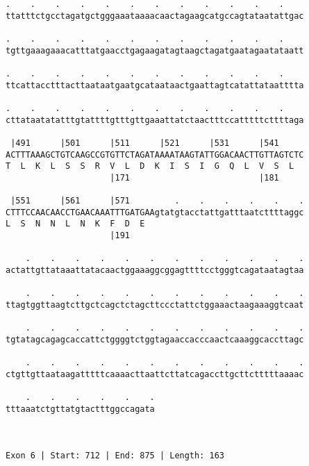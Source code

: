 \documentclass{article}
\begin{document}
\begin{Verbatim}
.    .    .    .    .    .    .    .    .    .    .    .    
ttatttctgcctagatgctgggaaataaaacaactagaagcatgccagtataatattgac
                                                            
.    .    .    .    .    .    .    .    .    .    .    .    
tgttgaaagaaacatttatgaacctgagaagatagtaagctagatgaatagaatataatt
                                                            
.    .    .    .    .    .    .    .    .    .    .    .    
ttcattacctttacttaataatgaatgcataataactgaattagtcatattataatttta
                                                            
.    .    .    .    .    .    .    .    .    .    .    .    
cttataatatatttgtattttgtttgttgaaattatctaactttccatttttcttttaga
                                                            
 |491      |501      |511      |521      |531      |541     
ACTTTAAAGCTGTCAAGCCGTGTTCTAGATAAAATAAGTATTGGACAACTTGTTAGTCTC
T  L  K  L  S  S  R  V  L  D  K  I  S  I  G  Q  L  V  S  L  
                     |171                          |181     
  
 |551      |561      |571         .    .    .    .    .    .
CTTTCCAACAACCTGAACAAATTTGATGAAgtatgtacctattgatttaatcttttaggc
L  S  N  N  L  N  K  F  D  E                                
                     |191                                   
  
    .    .    .    .    .    .    .    .    .    .    .    .
actattgttataaattatacaactggaaaggcggagttttcctgggtcagataatagtaa
                                                            
    .    .    .    .    .    .    .    .    .    .    .    .
ttagtggttaagtcttgctcagctctagcttccctattctggaaactaagaaaggtcaat
                                                            
    .    .    .    .    .    .    .    .    .    .    .    .
tgtatagcagagcaccattctggggtctggtagaaccacccaactcaaaggcaccttagc
                                                            
    .    .    .    .    .    .    .    .    .    .    .    .
ctgttgttaataagatttttcaaaacttaattcttatcagaccttgcttctttttaaaac
                                                            
    .    .    .    .    .    .
tttaaatctgttatgtactttggccagata
                              
                              
 
Exon 6 | Start: 712 | End: 875 | Length: 163




\end{Verbatim}
\end{document}
